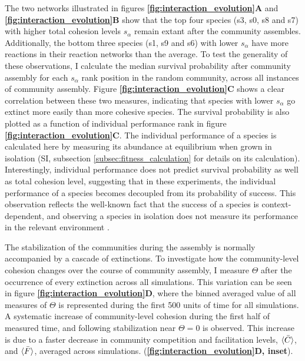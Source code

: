 \documentclass[titlepage,11pt]{article}
\begin{document}
\begin{linenumbers}
			The two networks illustrated in figures \textbf{\ref{fig:interaction_evolution}A} and \textbf{\ref{fig:interaction_evolution}B} show that the top four species (s3, s0, s8 and s7) with higher total cohesion levels $ s_{\alpha} $ remain extant after the community assembles. Additionally, the bottom three species (s1, s9 and s6) with lower $ s_{\alpha} $ have more reactions in their reaction networks than the average. To test the generality of these observations, I calculate the median survival probability after community assembly for each $ s_{\alpha} $ rank position in the random community, across all instances of community assembly. Figure \textbf{\ref{fig:interaction_evolution}C} shows a clear correlation between these two measures, indicating that species with lower $ s_{\alpha} $ go extinct more easily than more cohesive species. The survival probability is also plotted as a function of individual performance rank in figure \textbf{\ref{fig:interaction_evolution}C}. The individual performance of a species is calculated here by measuring its abundance at equilibrium when grown in isolation (SI, subsection \ref{subsec:fitness_calculation} for details on its calculation). Interestingly, individual performance does not predict survival probability as well as total cohesion level, suggesting that in these experiments, the individual performance of a species becomes decoupled from its probability of success. This observation reflects the well-known fact that the success of a species is context-dependent, and observing a species in isolation does not measure its performance in the relevant environment \citep{Tikhonov2016, McGill2006, Mcintire2014}.\par
			The stabilization of the communities during the assembly is normally accompanied by a cascade of extinctions.
			To investigate how the community-level cohesion changes over the course of community assembly, I measure $ \Theta $ after the occurrence of every extinction across all simulations. This variation can be seen in figure \textbf{\ref{fig:interaction_evolution}D}, where the binned averaged value of all measures of $ \Theta $ is represented during the first 500 units of time for all simulations. A systematic increase of community-level cohesion during the first half of measured time, and following stabilization near $ \Theta = 0 $ is observed. This increase is due to a faster decrease in community competition and facilitation levels, $ \braket{\bar{C}} $, and $ \braket{\bar{F}} $, averaged across simulations.  (\textbf{\ref{fig:interaction_evolution}D, inset}).\par

\end{linenumbers}
\end{document}
